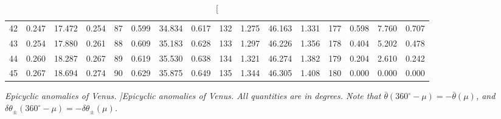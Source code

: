 \begin{table}
{\begin{tabular}{rrrr|rrrr|rrrr|rrrr}
 42 & \tiny{  0.247} &  17.472 & \tiny{  0.254} &  87 & \tiny{  0.599} &  34.834 & \tiny{  0.617} & 132 & \tiny{  1.275} &  46.163 & \tiny{  1.331} & 177 & \tiny{  0.598} &   7.760 & \tiny{  0.707}\\
 43 & \tiny{  0.254} &  17.880 & \tiny{  0.261} &  88 & \tiny{  0.609} &  35.183 & \tiny{  0.628} & 133 & \tiny{  1.297} &  46.226 & \tiny{  1.356} & 178 & \tiny{  0.404} &   5.202 & \tiny{  0.478}\\
 44 & \tiny{  0.260} &  18.287 & \tiny{  0.267} &  89 & \tiny{  0.619} &  35.530 & \tiny{  0.638} & 134 & \tiny{  1.321} &  46.274 & \tiny{  1.382} & 179 & \tiny{  0.204} &   2.610 & \tiny{  0.242}\\
 45 & \tiny{  0.267} &  18.694 & \tiny{  0.274} &  90 & \tiny{  0.629} &  35.875 & \tiny{  0.649} & 135 & \tiny{  1.344} &  46.305 & \tiny{  1.408} & 180 & \tiny{  0.000} &   0.000 & \tiny{  0.000}\\
\end{tabular}}
\caption[\em Epicyclic anomalies of Venus. ]{\em Epicyclic anomalies of Venus. All quantities are in degrees. Note that $\bar{\theta}(360^\circ-\mu) = -\bar{\theta}(\mu)$, and $\delta\theta_{\pm}(360^\circ-\mu) = -\delta\theta_{\pm}(\mu)$. }\label{vt19}
\end{table}

